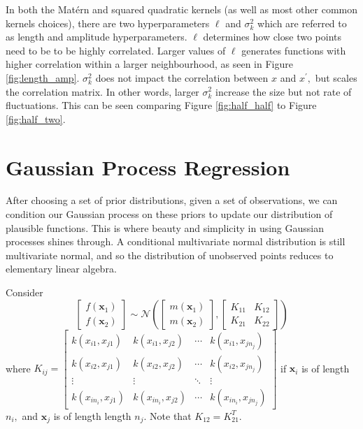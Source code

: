 In both the Mat\'ern and squared quadratic kernels
(as well as most other common kernels choices), there are two
hyperparameters $\ell$ and $\sigma^2_k$ which are referred to as length and
amplitude hyperparameters. $\ell$ determines how close two points need
to be to be highly correlated. Larger values of $\ell$ generates functions with
higher correlation within a larger neighbourhood,
as seen in Figure \ref{fig:length_amp}. $\sigma^2_k$ does not impact
the correlation between $x$ and $x^\prime,$ but scales the correlation
matrix. In other words, larger $\sigma^2_k$ increase the size but not rate of
fluctuations. This can be seen comparing Figure \ref{fig:half_half} to Figure
\ref{fig:half_two}.

\section{Gaussian Process Regression}

After choosing a set of prior distributions, given a set of observations, we
can condition our Gaussian process on these priors to update our distribution
of plausible functions. This is where beauty and simplicity in using Gaussian
processes shines through. A conditional multivariate normal distribution
is still multivariate normal, and so the distribution of unobserved points
reduces to elementary linear algebra.

Consider
$$
    \begin{bmatrix}
        f(\mathbf{x}_1) \\
        f(\mathbf{x}_2)
    \end{bmatrix} \sim \mathcal{N}\left(
    \begin{bmatrix}
            m(\mathbf{x}_1) \\
            m(\mathbf{x}_2)
        \end{bmatrix}, \begin{bmatrix}
            K_{11} & K_{12} \\
            K_{21} & K_{22}
        \end{bmatrix}
    \right)
$$
where $K_{ij} = \begin{bmatrix}
        k(x_{i1}, x_{j1})     & k(x_{i1}, x_{j2})     & \cdots & k(x_{i1}, x_{j{n_j}})     \\
        k(x_{i2}, x_{j1})     & k(x_{i2}, x_{j2})     & \cdots & k(x_{i2}, x_{j{n_j}})     \\
        \vdots                & \vdots                & \ddots & \vdots                    \\
        k(x_{i{n_i}}, x_{j1}) & k(x_{i{n_i}}, x_{j2}) & \cdots & k(x_{i{n_i}}, x_{j{n_j}})
    \end{bmatrix}$ if $\mathbf{x}_i$ is of length $n_i,$ and $\mathbf{x}_j$ is of length
length $n_j.$ Note that $K_{12} = K_{21}^T.$


